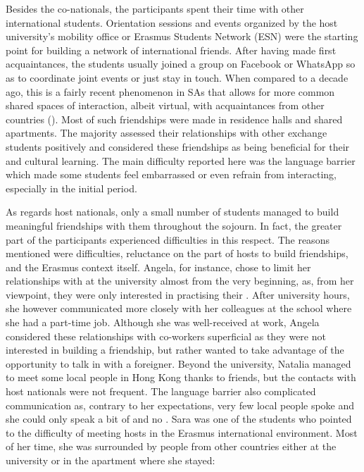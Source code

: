 \documentclass[output=paper]{langsci/langscibook}
\begin{document}
Besides the co-nationals, the participants spent their time with other international students. Orientation sessions and events organized by the host university’s mobility office or Erasmus Students Network (ESN) were the starting point for building a network of international friends. After having made first acquaintances, the students usually joined a group on Facebook or WhatsApp so as to coordinate joint events or just stay in touch. When compared to a decade ago, this is a fairly recent phenomenon in SAs that allows for more common shared spaces of interaction, albeit virtual, with acquaintances from other countries (\citealt{ColemanChafer2010}). Most of such friendships were made in residence halls and shared apartments. The majority assessed their relationships with other exchange students positively and considered these friendships as being beneficial for their  and cultural learning. The main difficulty reported here was the language barrier which made some students feel embarrassed or even refrain from interacting, especially in the initial period.    

As regards host nationals, only a small number of students managed to build meaningful friendships with them throughout the sojourn. In fact, the greater part of the participants experienced difficulties in this respect. The reasons mentioned were  difficulties, reluctance on the part of hosts to build friendships, and the Erasmus context itself. Angela, for instance, chose to limit her relationships with  at the university almost from the very beginning, as, from her viewpoint, they were only interested in practising their . After university hours, she however communicated more closely with her  colleagues at the school where she had a part-time job. Although she was well-received at work, Angela considered these relationships with co-workers superficial as they were not interested in building a friendship, but rather wanted to take advantage of the opportunity to talk in  with a foreigner. Beyond the university, Natalia managed to meet some local people in Hong Kong thanks to friends, but the contacts with host nationals were not frequent. The language barrier also complicated communication as, contrary to her expectations, very few local people spoke  and she could only speak a bit of  and no . Sara was one of the students who pointed to the difficulty of meeting hosts in the Erasmus international environment. Most of her time, she was surrounded by people from other countries either at the university or in the apartment where she stayed: 
\end{document}

